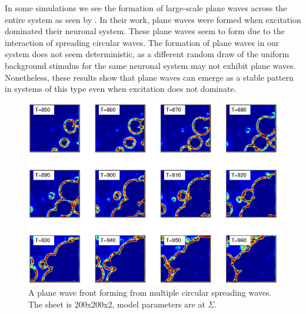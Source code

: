 In some simulations we see the formation of large-scale plane waves across the entire system as seen by \citet{keane2015}.
In their work, plane waves were formed when excitation dominated their neuronal system.
These plane waves seem to form due to the interaction of spreading circular waves.
The formation of plane waves in our system does not seem deterministic, as a different random draw of the uniform background stimulus for the same neuronal system may not exhibit plane waves.
Nonetheless, these results show that plane waves can emerge as a stable pattern in systems of this type even when excitation does not dominate.
\begin{figure}[!htb]
 \caption{ A plane wave front forming from multiple circular spreading waves.
          The sheet is 200x200x2, model parameters are at $\Sigma$.}
 \label{fig:2D_plane_wave}
 \centering
   \includegraphics[width=\textwidth]{fig/2DPlaneWave}
\end{figure}
\FloatBarrier

